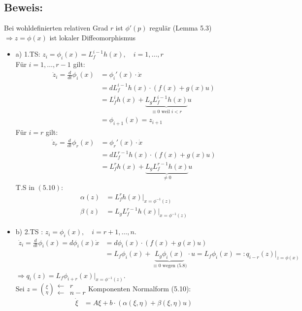 \documentclass[ngerman]{tudscrreprt}
\begin{document}
\subsection*{Beweis: } Bei wohldefinierten relativen Grad $r$ ist $\phi'(p)$ regulär (Lemma 5.3)\\ 
$\Rightarrow  z= \phi(x) $ ist lokaler Diffeomorphismus 
\begin{itemize}
\item a) 1.TS: $z_i = \phi_i(x) = L_f^{i-1} h(x), \quad i=1,\dots, r$\\ Für $i=1,\dots, r-1$ gilt: \begin{align*}
\dot z_i = \frac{d}{dt} \phi_i(x) &= \phi_i'(x)\cdot \dot x\\ &=dL_f^{i-1}h(x)\cdot (f(x) + g(x) u)\\ 
&= L_f^i h(x) + \underbrace{L_g L_f^{i-1} h(x)}_{\equiv 0 \text{ weil } i< r } u\\ 
&= \phi_{i+1}(x) = z_{i+1} 
\end{align*}
Für $i = r $ gilt: \begin{align*} \dot z_r = \frac{d}{dt} \phi_r(x) &= \phi_r'(x)\cdot \dot x\\ 
&= dL_f^{r-1}h(x) \cdot (f(x) + g(x) u)\\ 
&= L_f^r h(x) + \underbrace{ L_g L_f^{r-1} h(x)}_{\ne 0} u 
\end{align*} 
T.S in $(5.10)$: \begin{align*} \alpha(z) &= L_f^r h(x)|_{x = \phi^{-1} (z)}\\ 
\beta(z) &= L_g L_f^{r-1} h(x)|_{x = \phi^{-1}(z)}
\end{align*}
\item b) 2.TS : $ z_i = \phi_i(x), \quad i = r+1,\dots, n. $ \begin{align*}
\dot z_i = \frac{d}{dt} \phi_i(x) = d\phi_i(x)\dot x &= d\phi_i(x)\cdot (f(x) + g(x) u)\\ &= L_f\phi_i(x) + \underbrace{L_g \phi_i(x)}_{\equiv 0 \text{ wegen (5.8)}}\cdot u = L_f \phi_i(x) =:q_{i-r}(z)|_{z = \phi(x)}
\end{align*}
$\Rightarrow q_i(z) = L_f \phi_{i+r}(x)|_{x = \phi^{-1} (z) } $. \\ 
Sei $z = \binom{\xi}{\eta} \begin{matrix}\leftarrow &r \\ \leftarrow &n-r \end{matrix} $Komponenten 
Normalform (5.10): \begin{align*}
\dot \xi &= A\xi + b\cdot (\alpha (\xi, \eta) + \beta (\xi, \eta) u)\\ 

\end{align*}
\end{itemize}
\end{document}
